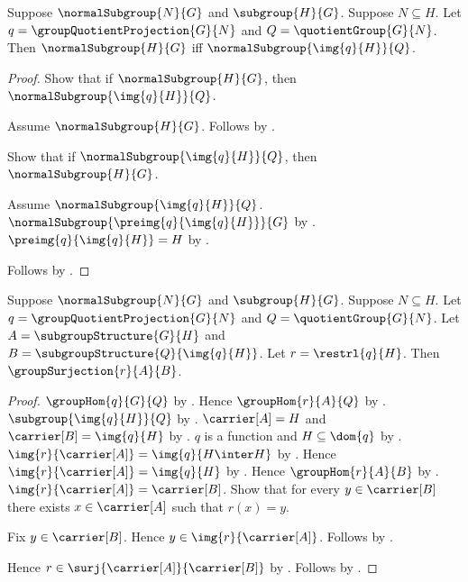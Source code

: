 \begin{corollary}\label{group_quotient_correspondence_normal_iff}
    Suppose $\normalSubgroup{N}{G}$ and $\subgroup{H}{G}$.
    Suppose $N\subseteq H$.
    Let $q=\groupQuotientProjection{G}{N}$ and
        $Q=\quotientGroup{G}{N}$.
    Then $\normalSubgroup{H}{G}$ iff
        $\normalSubgroup{\img{q}{H}}{Q}$.
\end{corollary}
\begin{proof}
    Show that if $\normalSubgroup{H}{G}$, then
        $\normalSubgroup{\img{q}{H}}{Q}$.
    \begin{subproof}
        Assume $\normalSubgroup{H}{G}$.
        Follows by .
    \end{subproof}
    Show that if $\normalSubgroup{\img{q}{H}}{Q}$, then
        $\normalSubgroup{H}{G}$.
    \begin{subproof}
        Assume $\normalSubgroup{\img{q}{H}}{Q}$.
        $\normalSubgroup{\preimg{q}{\img{q}{H}}}{G}$ by
            .
        $\preimg{q}{\img{q}{H}}=H$ by
            .
    \end{subproof}
    Follows by \auto.
\end{proof}

\begin{theorem}\label{group_quotient_correspondence_restriction_surjection}
    Suppose $\normalSubgroup{N}{G}$ and $\subgroup{H}{G}$.
    Suppose $N\subseteq H$.
    Let $q=\groupQuotientProjection{G}{N}$ and
        $Q=\quotientGroup{G}{N}$.
    Let $A=\subgroupStructure{G}{H}$ and
        $B=\subgroupStructure{Q}{\img{q}{H}}$.
    Let $r=\restrl{q}{H}$.
    Then $\groupSurjection{r}{A}{B}$.
\end{theorem}
\begin{proof}
    $\groupHom{q}{G}{Q}$ by
        .
    Hence $\groupHom{r}{A}{Q}$ by
        .
    $\subgroup{\img{q}{H}}{Q}$ by
        .
    $\carrier[A]=H$ and $\carrier[B]=\img{q}{H}$ by
        .
    $q$ is a function and $H\subseteq\dom{q}$ by
        .
    $\img{r}{\carrier[A]}=\img{q}{H\inter H}$ by
        .
    Hence $\img{r}{\carrier[A]}=\img{q}{H}$ by
        .
    Hence $\groupHom{r}{A}{B}$ by
        .
    $\img{r}{\carrier[A]}=\carrier[B]$.
    Show that for every $y\in\carrier[B]$ there exists
        $x\in\carrier[A]$ such that $r(x)=y$.
    \begin{subproof}
        Fix $y\in\carrier[B]$.
        Hence $y\in\img{r}{\carrier[A]}$.
        Follows by .
    \end{subproof}
    Hence $r\in\surj{\carrier[A]}{\carrier[B]}$ by
        .
    Follows by .
\end{proof}


